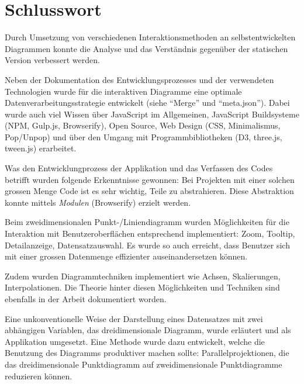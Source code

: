 \chapter{Schlusswort}

Durch Umsetzung von verschiedenen Interaktionsmethoden an selbstentwickelten Diagrammen konnte die Analyse und das Verständnis gegenüber der statischen Version verbessert werden.

Neben der Dokumentation des Entwicklungsprozesses und der verwendeten Technologien wurde für die interaktiven Diagramme eine optimale Datenverarbeitungsstrategie entwickelt (siehe "`Merge"' und "`meta.json"'). Dabei wurde auch viel Wissen über JavaScript im Allgemeinen, JavaScript Buildsysteme (NPM, Gulp.js, Browserify), Open Source, Web Design (CSS, Minimalismus, Pop/Unpop) und über den Umgang mit Programmbibliotheken (D3, three.js, tween.js) erarbeitet.

Was den Entwicklungprozess der Applikation und das Verfassen des Codes betrifft wurden folgende Erkenntnisse gewonnen: Bei Projekten mit einer solchen grossen Menge Code ist es sehr wichtig, Teile zu abstrahieren. Diese Abstraktion konnte mittels \textit{Modulen} (Browserify) erzielt werden.

Beim zweidimensionalen Punkt-/Liniendiagramm wurden Möglichkeiten für die Interaktion mit Benutzeroberflächen entsprechend implementiert: Zoom, Tooltip, Detailanzeige, Datensatzauswahl. Es wurde so auch erreicht, dass Benutzer sich mit einer grossen Datenmenge effizienter auseinandersetzen können. 

Zudem wurden Diagrammtechniken implementiert wie Achsen, Skalierungen, Interpolationen. Die Theorie hinter diesen Möglichkeiten und Techniken sind ebenfalls in der Arbeit dokumentiert worden.

Eine unkonventionelle Weise der Darstellung eines Datensatzes mit zwei abhängigen Variablen, das dreidimensionale Diagramm, wurde erläutert und als Applikation umgesetzt. Eine Methode wurde dazu entwickelt, welche die Benutzung des Diagramms produktiver machen sollte: Parallelprojektionen, die das dreidimensionale Punktdiagramm auf zweidimensionale Punktdiagramme reduzieren können.
